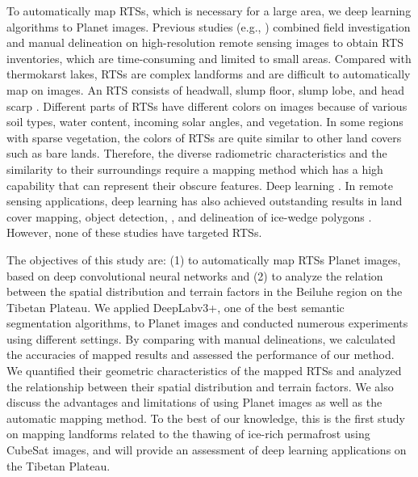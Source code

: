 \documentclass[authoryear,preprint,review,12pt]{elsarticle}
\begin{document}
To automatically map RTSs, which is necessary for a large area, we  deep learning algorithms to Planet images. Previous studies (e.g., \citealp{ramage_terrain_2017, lantuit_fifty_2008, niu2014thaw}) combined field investigation and manual delineation on high-resolution remote sensing images to obtain RTS inventories, which are time-consuming and limited to small areas. Compared with thermokarst lakes, RTSs are complex landforms and are difficult to automatically map on images. An RTS consists of headwall, slump floor, slump lobe, and head scarp \citep{lantuit_fifty_2008}. Different parts of RTSs have different colors on images because of various soil types, water content, incoming solar angles, and vegetation. In some regions with sparse vegetation, the colors of RTSs are quite similar to other land covers such as bare lands. Therefore, the diverse radiometric characteristics and the similarity to their surroundings require a mapping method which has a high capability that can represent their obscure features. Deep learning  .  In remote sensing applications, deep learning has also achieved outstanding results in land cover mapping, object detection, , and delineation of ice-wedge polygons . However, none of these studies have targeted RTSs. 

The objectives of this study are: (1) to automatically map RTSs  Planet images, based on deep convolutional neural networks and (2) to analyze the relation between the spatial distribution and terrain factors in the Beiluhe region on the Tibetan Plateau. We applied DeepLabv3+, one of the best semantic segmentation algorithms, to Planet images and conducted numerous experiments using different settings. By comparing with manual delineations, we calculated the accuracies of mapped results and assessed the performance of our method. We quantified their geometric characteristics of the mapped RTSs and analyzed the relationship between their spatial distribution and terrain factors. We also discuss the advantages and limitations of using Planet images as well as the automatic mapping method. 
To the best of our knowledge, this is the first study on mapping landforms related to the thawing of ice-rich permafrost using CubeSat images, and will provide an assessment of deep learning applications on the Tibetan Plateau.
\end{document}
